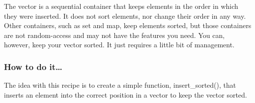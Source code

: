 
The vector is a sequential container that keeps elements in the order in which they were inserted. It does not sort elements, nor change their order in any way. Other containers, such as set and map, keep elements sorted, but those containers are not random-access and may not have the features you need. You can, however, keep your vector sorted. It just requires a little bit of management.

\subsubsection{How to do it…}

The idea with this recipe is to create a simple function, insert\_sorted(), that inserts an element into the correct position in a vector to keep the vector sorted.

